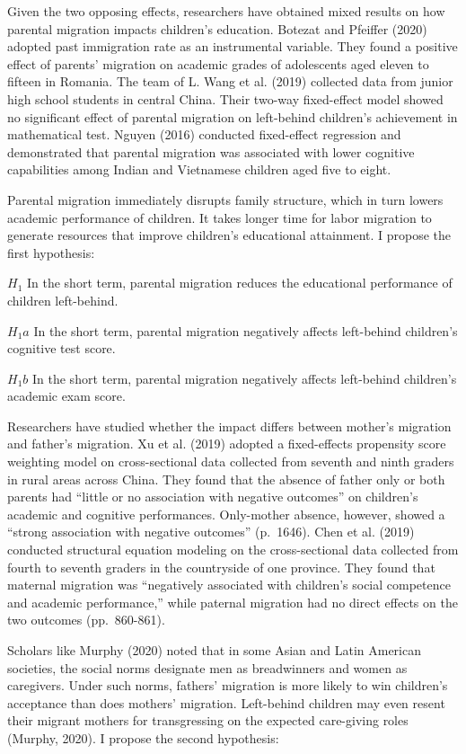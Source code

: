 \documentclass[
  man,floatsintext]{apa7}
\begin{document}
Given the two opposing effects, researchers have obtained mixed results on how parental migration impacts children's education. Botezat and Pfeiffer (2020) adopted past immigration rate as an instrumental variable. They found a positive effect of parents' migration on academic grades of adolescents aged eleven to fifteen in Romania. The team of L. Wang et al. (2019) collected data from junior high school students in central China. Their two-way fixed-effect model showed no significant effect of parental migration on left-behind children's achievement in mathematical test. Nguyen (2016) conducted fixed-effect regression and demonstrated that parental migration was associated with lower cognitive capabilities among Indian and Vietnamese children aged five to eight.

Parental migration immediately disrupts family structure, which in turn lowers academic performance of children. It takes longer time for labor migration to generate resources that improve children's educational attainment. I propose the first hypothesis:

\(H_1\) In the short term, parental migration reduces the educational performance of children left-behind.

\(H_1a\) In the short term, parental migration negatively affects left-behind children's cognitive test score.

\(H_1b\) In the short term, parental migration negatively affects left-behind children's academic exam score.

Researchers have studied whether the impact differs between mother's migration and father's migration. Xu et al. (2019) adopted a fixed-effects propensity score weighting model on cross-sectional data collected from seventh and ninth graders in rural areas across China. They found that the absence of father only or both parents had ``little or no association with negative outcomes'' on children's academic and cognitive performances. Only-mother absence, however, showed a ``strong association with negative outcomes'' (p.~1646). Chen et al. (2019) conducted structural equation modeling on the cross-sectional data collected from fourth to seventh graders in the countryside of one province. They found that maternal migration was ``negatively associated with children's social competence and academic performance,'' while paternal migration had no direct effects on the two outcomes (pp.~860-861).

Scholars like Murphy (2020) noted that in some Asian and Latin American societies, the social norms designate men as breadwinners and women as caregivers. Under such norms, fathers' migration is more likely to win children's acceptance than does mothers' migration. Left-behind children may even resent their migrant mothers for transgressing on the expected care-giving roles (Murphy, 2020). I propose the second hypothesis:
\end{document}
